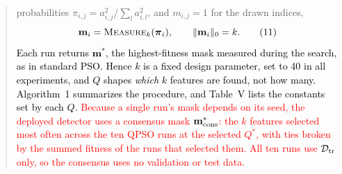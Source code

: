 \documentclass[11pt]{article}
\newenvironment{excerpt}{\begin{quote}\sloppy}{\end{quote}}
\begin{document}
\begin{excerpt}
{probabilities $\pi_{i,j}=a_{i,j}^{2}/\sum_{l}a_{i,l}^{2}$, and
$m_{i,j}=1$ for the drawn indices,}
\begin{equation}
\textcolor{black}{\mathbf{m}_i = \textsc{Measure}_k(\boldsymbol{\pi}_i),
\qquad \|\mathbf{m}_i\|_0 = k .}
\tag{11}
\end{equation}
\textcolor{black}{Each run returns $\mathbf{m}^{*}$, the
highest-fitness mask measured during the search, as in standard PSO.
Hence $k$ is a fixed design parameter, set to 40 in all experiments,
and $Q$ shapes \emph{which} $k$ features are found, not how many.
Algorithm~1 summarizes the procedure, and
Table~V lists the constants set by each $Q$.}
\textcolor{red}{Because a single run's mask depends on its
seed, the deployed detector uses a consensus mask
$\mathbf{m}^{*}_{\rm cons}$: the $k$ features selected most often
across the ten QPSO runs at the selected $Q^{*}$, with ties broken by
the summed fitness of the runs that selected them. All ten runs use
$\mathcal{D}_{\rm tr}$ only, so the consensus uses no validation or
test data.}
\end{excerpt}
\end{document}
